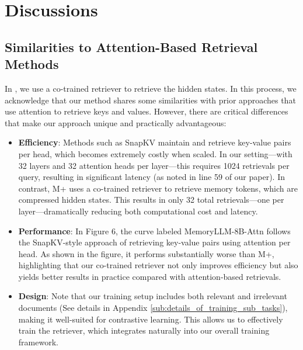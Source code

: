 \section{Discussions}
\subsection{Similarities to Attention-Based Retrieval Methods}
\label{sub:attention_based_retrieval_methods}
In \ours, we use a co-trained retriever to retrieve the hidden states. In this process, we acknowledge that our method shares some similarities with prior approaches that use attention to retrieve keys and values. However, there are critical differences that make our approach unique and practically advantageous: 
\begin{itemize}
    \item  \textbf{Efficiency}: Methods such as SnapKV maintain and retrieve key-value pairs per head, which becomes extremely costly when scaled. In our setting—with 32 layers and 32 attention heads per layer—this requires 1024 retrievals per query, resulting in significant latency (as noted in line 59 of our paper). In contrast, M+ uses a co-trained retriever to retrieve memory tokens, which are compressed hidden states. This results in only 32 total retrievals—one per layer—dramatically reducing both computational cost and latency.
    \item \textbf{Performance}: In Figure 6, the curve labeled MemoryLLM-8B-Attn follows the SnapKV-style approach of retrieving key-value pairs using attention per head. As shown in the figure, it performs substantially worse than M+, highlighting that our co-trained retriever not only improves efficiency but also yields better results in practice compared with attention-based retrievals.
    \item \textbf{Design}: Note that our training setup includes both relevant and irrelevant documents (See details in Appendix \ref{sub:details_of_training_sub_tasks}), making it well-suited for contrastive learning. This allows us to effectively train the retriever, which integrates naturally into our overall training framework.
\end{itemize}

